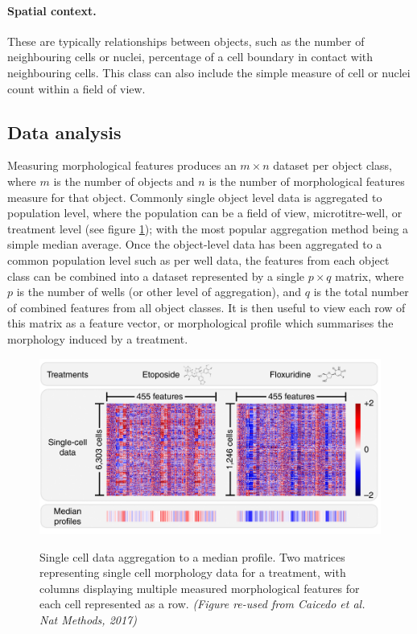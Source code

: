 \documentclass[a4paper,11pt,twoside,openright]{scrbook}
\begin{document}
\paragraph{Spatial context.}
These are typically relationships between objects, such as the number of neighbouring cells or nuclei, percentage of a cell boundary in contact with neighbouring cells. This class can also include the simple measure of cell or nuclei count within a field of view.


\subsection{Data analysis}
Measuring morphological features produces an $m \times n$ dataset per object class, where $m$ is the number of objects and $n$ is the number of morphological features measure for that object.
Commonly single object level data is aggregated to population level, where the population can be a field of view, microtitre-well, or treatment level (see figure \ref{figure:aggregation}); with the most popular aggregation method being a simple median average. \cite{Caicedo2017}
Once the object-level data has been aggregated to a common population level such as per well data, the features from each object class can be combined into a dataset represented by a single $p \times q$ matrix, where $p$ is the number of wells (or other level of aggregation), and $q$ is the total number of combined features from all object classes.
It is then useful to view each row of this matrix as a feature vector, or morphological profile which summarises the morphology induced by a treatment.


\begin{figure}
    \captionsetup{width=0.8\textwidth}
    \caption[Single cell aggregation to a median profile]{Single cell data aggregation to a median profile. Two matrices representing single cell morphology data for a treatment, with columns displaying multiple measured morphological features for each cell represented as a row. \textit{(Figure re-used from Caicedo et al. Nat Methods, 2017)}}
    \includegraphics[width=0.8\linewidth]{figs/ch1SingleCellAggregation}
    \label{figure:aggregation}
\end{figure}
\end{document}
